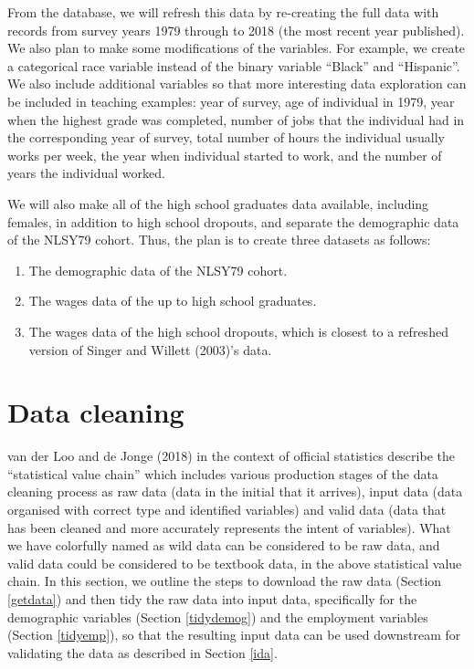 \documentclass{article}
\begin{document}
From the database, we will refresh this data by re-creating the full data with records from survey years 1979 through to 2018 (the most recent year published). We also plan to make some modifications of the variables. For example, we create a categorical race variable instead of the binary variable ``Black'' and ``Hispanic''. We also include additional variables so that more interesting data exploration can be included in teaching examples: year of survey, age of individual in 1979, year when the highest grade was completed, number of jobs that the individual had in the corresponding year of survey, total number of hours the individual usually works per week, the year when individual started to work, and the number of years the individual worked.

We will also make all of the high school graduates data available, including females, in addition to high school dropouts, and separate the demographic data of the NLSY79 cohort. Thus, the plan is to create three datasets as follows:

\begin{enumerate}
\def\labelenumi{\arabic{enumi}.}
\tightlist
\item
  The demographic data of the NLSY79 cohort.
\item
  The wages data of the up to high school graduates.
\item
  The wages data of the high school dropouts, which is closest to a refreshed version of Singer and Willett (2003)'s data.
\end{enumerate}

\hypertarget{cleaning}{%
\section{Data cleaning}\label{cleaning}}

van der Loo and de Jonge (2018) in the context of official statistics describe the ``statistical value chain'' which includes various production stages of the data cleaning process as raw data (data in the initial that it arrives), input data (data organised with correct type and identified variables) and valid data (data that has been cleaned and more accurately represents the intent of variables). What we have colorfully named as wild data can be considered to be raw data, and valid data could be considered to be textbook data, in the above statistical value chain. In this section, we outline the steps to download the raw data (Section \ref{getdata}) and then tidy the raw data into input data, specifically for the demographic variables (Section \ref{tidydemog}) and the employment variables (Section \ref{tidyemp}), so that the resulting input data can be used downstream for validating the data as described in Section \ref{ida}.
\end{document}

